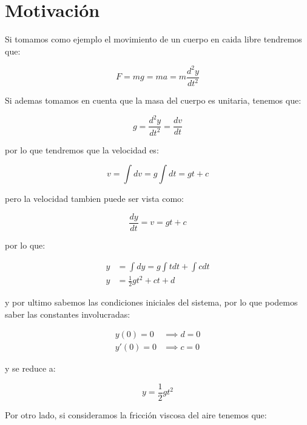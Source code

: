 
\section{Motivación}

	Si tomamos como ejemplo el movimiento de un cuerpo en caida libre tendremos que:

	\begin{equation*}
		F = mg = ma = m \frac{d^2 y}{dt^2}
	\end{equation*}

	Si ademas tomamos en cuenta que la masa del cuerpo es unitaria, tenemos que:

	\begin{equation*}
		g = \frac{d^2y}{dt^2} = \frac{dv}{dt}
	\end{equation*}

	por lo que tendremos que la velocidad es:

	\begin{equation*}
		v = \int dv = g \int dt = gt + c
	\end{equation*}

	pero la velocidad tambien puede ser vista como:

	\begin{equation*}
		\frac{dy}{dt} = v = gt + c	
	\end{equation*}

	por lo que:

	\begin{align*}
		y &= \int dy = g \int t dt + \int c dt \\
		y &= \frac{1}{2} gt^2 + ct + d
	\end{align*}

	y por ultimo sabemos las condiciones iniciales del sistema, por lo que podemos saber las constantes involucradas:

	\begin{align*}
		y(0) = 0 &\implies d = 0 \\
		y'(0) = 0 &\implies c = 0
	\end{align*}

	y se reduce a:

	\begin{equation*}
		y = \frac{1}{2} gt^2
	\end{equation*}

	Por otro lado, si consideramos la fricción viscosa del aire tenemos que:

